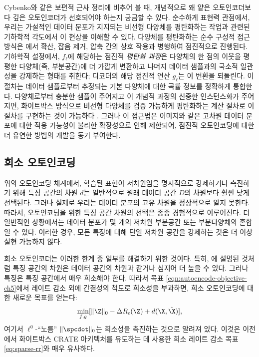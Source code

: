 \documentclass[../../book-main_ko.tex]{subfiles}
\begin{document}
Cybenko와 같은 보편적 근사 정리에 비추어 볼 때, 개념적으로 왜 얕은 오토인코더보다 깊은 오토인코더가 선호되어야 하는지 궁금할 수 있다.
순수하게 표현력 관점에서, 우리는 가설적인 데이터 분포가 지지되는 비선형 다양체를 평탄화하는 작업과 관련된 기하학적 각도에서 이 현상을 이해할 수 있다. 다양체를 평탄화하는 순수 구성적 접근 방식은 에서 확산, 잡음 제거, 압축 간의 상호 작용과 병행하여 점진적으로 진행된다. 기하학적 설정에서, $f_{\ell}$에 해당하는 점진적 \textit{평탄화 과정}은 다양체의 한 점의 이웃을 평평한 다양체(즉, 부분공간)에 더 가깝게 변환하고 나머지 데이터 샘플과의 국소적 일관성을 강제하는 형태를 취한다; 디코더의 해당 점진적 연산 $g_{\ell}$는 이 변환을 되돌린다. 이 절차는 데이터 샘플로부터 추정되는 기본 다양체에 대한 곡률 정보를 정확하게 통합한다. 다양체로부터 충분한 샘플이 주어지고 이 개념적 과정의 신중한 인스턴스화가 주어지면, 화이트박스 방식으로 비선형 다양체를 검증 가능하게 평탄화하는 계산 절차로 이 절차를 구현하는 것이 가능하다 \cite{Psenka-JMLR24}. 그러나 이 접근법은 이미지와 같은 고차원 데이터 분포에 대한 적용 가능성이 불리한 확장성으로 인해 제한되어, 점진적 오토인코딩에 대한 더 유연한 방법의 개발을 동기 부여한다.

\subsection{희소 오토인코딩}
위의 오토인코딩 체계에서, 학습된 표현이 저차원임을 명시적으로 강제하거나 촉진하기 위해 특징 공간의 차원 $d$는 일반적으로 원래 데이터 공간 $D$의 차원보다 훨씬 낮게 선택된다. 그러나 실제로 우리는 데이터 분포의 고유 차원을 정상적으로 알지 못한다. 따라서, 오토인코딩을 위한 특징 공간 차원의 선택은 종종 경험적으로 이루어진다. 더 일반적인 상황에서는 데이터 분포가 몇 개의 저차원 부분공간 또는 부분다양체의 혼합일 수 있다. 이러한 경우, 모든 특징에 대해 단일 저차원 공간을 강제하는 것은 더 이상 실현 가능하지 않다.

희소 오토인코더는 이러한 한계 중 일부를 해결하기 위한 것이다. 특히, 에 설명된 것처럼 특징 공간의 차원은 데이터 공간의 차원과 같거나 심지어 더 높을 수 있다. 그러나 특징은 특징 공간에서 매우 희소해야 한다. 따라서 목표 \eqref{eqn:autoencode-objective-ch5}에서 레이트 감소 외에 간결성의 척도로 희소성을 부과하면, 희소 오토인코딩에 대한 새로운 목표를 얻는다:
\begin{equation}
  \min_{f, g}
  [\|\Z\|_0 - \Delta R_{\epsilon}(\Z) + d(\X, \hat \X)],
  \label{eqn:autoencode-sparse}
\end{equation}
여기서 $\ell^0$-``노름'' $\|\spcdot\|_0$는 희소성을 촉진하는 것으로 알려져 있다.
이것은 이전 에서 화이트박스 CRATE 아키텍처를 유도하는 데 사용한 희소 레이트 감소 목표 \eqref{eq:sparse-rr}와 매우 유사하다.
\end{document}
